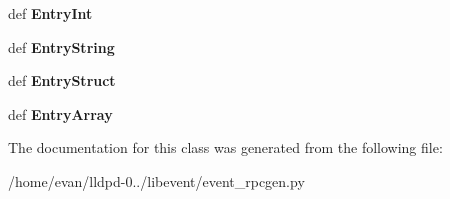 \begin{DoxyCompactItemize}
\item 
def {\bfseries \-Entry\-Int}\label{classevent__rpcgen_1_1_c_code_generator_afd4747af0e2dcfd6e5af79568f4309e0}

\item 
def {\bfseries \-Entry\-String}\label{classevent__rpcgen_1_1_c_code_generator_abfc2d553c07cac89c7bcec91d2b80ff0}

\item 
def {\bfseries \-Entry\-Struct}\label{classevent__rpcgen_1_1_c_code_generator_a115bb51c67a76fb358a8ad0d03c4fa3d}

\item 
def {\bfseries \-Entry\-Array}\label{classevent__rpcgen_1_1_c_code_generator_a927d8ba2de3ce06c80aba8c9b82bfaa4}

\end{DoxyCompactItemize}


\-The documentation for this class was generated from the following file\-:\begin{DoxyCompactItemize}
\item 
/home/evan/lldpd-\/0../libevent/event\-\_\-rpcgen.\-py\end{DoxyCompactItemize}
